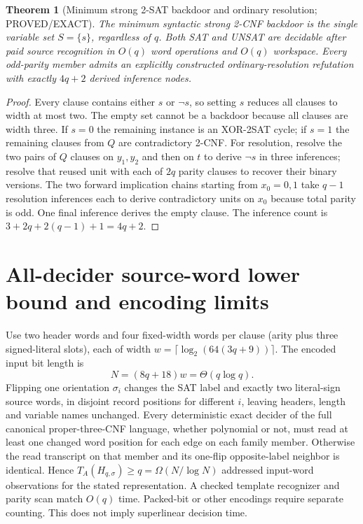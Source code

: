 \documentclass[11pt]{article}
\newtheorem{theorem}{Theorem}
\begin{document}
\begin{theorem}[Minimum strong 2-SAT backdoor and ordinary resolution; PROVED/EXACT]
The minimum syntactic strong 2-CNF backdoor is the single variable set $S=\{s\}$, regardless of $q$. Both SAT and UNSAT are decidable after paid source recognition in $O(q)$ word operations and $O(q)$ workspace. Every odd-parity member admits an explicitly constructed ordinary-resolution refutation with exactly $4q+2$ derived inference nodes.
\end{theorem}
\begin{proof}
Every clause contains either $s$ or $\neg s$, so setting $s$ reduces all clauses to width at most two. The empty set cannot be a backdoor because all clauses are width three. If $s=0$ the remaining instance is an XOR-2SAT cycle; if $s=1$ the remaining clauses from $Q$ are contradictory 2-CNF. For resolution, resolve the two pairs of $Q$ clauses on $y_1,y_2$ and then on $t$ to derive $\neg s$ in three inferences; resolve that reused unit with each of $2q$ parity clauses to recover their binary versions. The two forward implication chains starting from $x_0=0,1$ take $q-1$ resolution inferences each to derive contradictory units on $x_0$ because total parity is odd. One final inference derives the empty clause. The inference count is $3+2q+2(q-1)+1=4q+2$. \end{proof}

\section{All-decider source-word lower bound and encoding limits}
Use two header words and four fixed-width words per clause (arity plus three signed-literal slots), each of width $w=\lceil\log_2(64(3q+9))\rceil$. The encoded input bit length is
\[
N=(8q+18)w=\Theta(q\log q).
\]
Flipping one orientation $\sigma_i$ changes the SAT label and exactly two literal-sign source words, in disjoint record positions for different $i$, leaving headers, length and variable names unchanged. Every deterministic exact decider of the full canonical proper-three-CNF language, whether polynomial or not, must read at least one changed word position for each edge on each family member. Otherwise the read transcript on that member and its one-flip opposite-label neighbor is identical. Hence $T_A(H_{q,\sigma})\ge q=\Omega(N/\log N)$ addressed input-word observations for the stated representation. A checked template recognizer and parity scan match $O(q)$ time. Packed-bit or other encodings require separate counting. This does not imply superlinear decision time.
\end{document}
